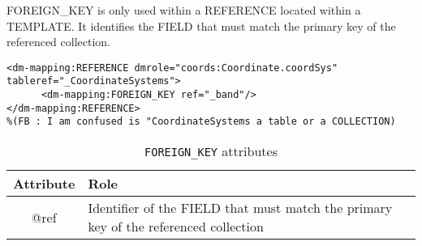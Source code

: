 FOREIGN\_KEY is only used within a REFERENCE located within a TEMPLATE.
It identifies the FIELD that must  match the primary key of the referenced collection.

\begin{lstlisting}[frame=single,caption={The REFERENCE is resolved by the INSTANCE of table \_CoordinateSystems that has a primary key equals to the value of the column  \_band},style=XML,basicstyle=\tiny]
<dm-mapping:REFERENCE dmrole="coords:Coordinate.coordSys" tableref="_CoordinateSystems">
      <dm-mapping:FOREIGN_KEY ref="_band"/>
</dm-mapping:REFERENCE>
%(FB : I am confused is "CoordinateSystems a table or a COLLECTION)
\end{lstlisting}

\begin{table}[!htbp]
\small
\centering
\begin{tabulary}{\linewidth}{|c|J|}       
       \hline 
            \textbf{Attribute} & 
            \textbf {Role}\\
       \hline         \hline  
             @ref& 
             Identifier of the FIELD that must  match the primary key of the referenced collection \\
     \hline
     \end{tabulary}
     \caption{\texttt{FOREIGN\_KEY} attributes} 
     \label{tbl:foreignkey-att}
 \end{table}
